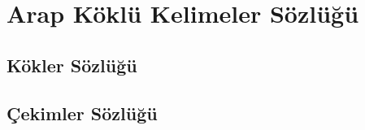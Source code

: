 
\chapter{Arap Köklü Kelimeler Sözlüğü}
\noindent
\setlength{\parindent}{0pt}


\newpage

\recalctypearea
{}

\section{Kökler Sözlüğü}

% 


\newpage
\section{Çekimler Sözlüğü}

% 


\restoregeometry
\recalctypearea


